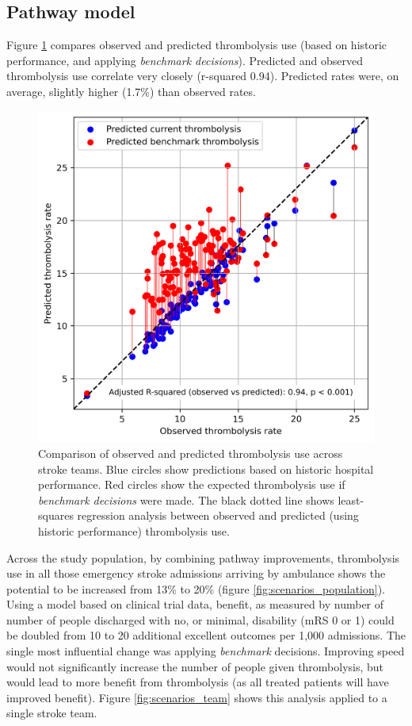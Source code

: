 \normalsize

\subsection{Pathway model}

Figure \ref{fig:thrombolysis_rates_teams} compares observed and predicted thrombolysis use (based on historic performance, and applying \textit{benchmark decisions}). Predicted and observed thrombolysis use correlate very closely (r-squared 0.94). Predicted rates were, on average, slightly higher (1.7\%) than observed rates.

\begin{figure}[!h]
    \centering
    \includegraphics[width=0.5\linewidth]{images/thrombolysis_rates_model}
    \caption{Comparison of observed and predicted thrombolysis use across stroke teams. Blue circles show predictions based on historic hospital performance. Red circles show the expected thrombolysis use if \textit{benchmark decisions} were made. The black dotted line shows least-squares regression analysis between observed and predicted (using historic performance) thrombolysis use.}
    \label{fig:thrombolysis_rates_teams}
\end{figure}


Across the study population, by combining pathway improvements, thrombolysis use in all those emergency stroke admissions arriving by ambulance shows the potential to be increased from 13\% to 20\% (figure \ref{fig:scenarios_population}). Using a model based on clinical trial data, benefit, as measured by number of number of people discharged with no, or minimal, disability (mRS 0 or 1) could be doubled from 10 to 20 additional excellent outcomes per 1,000 admissions. The single most influential change was applying \textit{benchmark} decisions. Improving speed would not significantly increase the number of people given thrombolysis, but would lead to more benefit from thrombolysis (as all treated patients will have improved benefit). Figure \ref{fig:scenarios_team} shows this analysis applied to a single stroke team.


